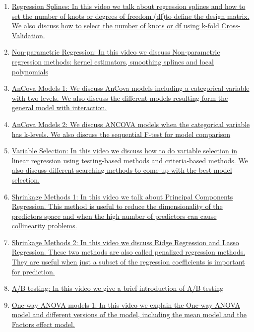 \documentclass[11pt]{article}
\begin{document}
\begin{enumerate}
	\item \href{https://mp.weixin.qq.com/s/4uLYtZnD3TQ-Oi7aF2BGug}{Regression Splines: In this video we talk about regression splines and how to set the number of knots or degrees of freedom  (df)to define the design matrix. We also discuss how to select the number of knots or df using k-fold Cross-Validation.}	%
	\item \href{https://mp.weixin.qq.com/s/MTY8Eyavgnd8c2npyh1Tkw}{Non-parametric Regression: In this video we discuss Non-parametric regression methods: kernel estimators, smoothing splines and local polynomials}	%
	\item \href{https://mp.weixin.qq.com/s/aq4OgekCqkyrpdShuakUFw}{AnCova Models 1: We discuss AnCova models including a categorical variable with two-levels. We also discuss the different models resulting form the general model with interaction.}	%
	\item \href{https://mp.weixin.qq.com/s/fydJsiF4AvlQAo9F_eY59Q}{AnCova Models 2: We discuss ANCOVA models when the categorical variable has k-levels. We also discuss the sequential F-test for model comparison}	%
	\item \href{https://mp.weixin.qq.com/s/8mDK4IzTxbvssrVxRTfkVQ}{Variable Selection: In this video we discuss how to do variable selection in linear regression using testing-based methods and criteria-based methods. We also discuss different searching methods to come up with the best model selection.}	%
	\item \href{https://mp.weixin.qq.com/s/BrPASb00jklNy0506RBLtw}{Shrinkage Methods 1: In this video we talk about Principal Components Regression. This method is useful to reduce the dimensionality of the predictors space and  when the high number of predictors  can cause collinearity problems.}	%
	\item \href{https://mp.weixin.qq.com/s/gie_Ndz74VJPEgB60rs8Pw}{Shrinkage Methods 2: In this video we discuss Ridge Regression and Lasso Regression. These two methods are also called penalized regression methods. They are useful when just a subset of the regression coefficients is important for prediction.}	%
	\item \href{https://mp.weixin.qq.com/s/M8ntjxVx4CHMo_NZmAWdjw}{ A/B testing: In this video we give a brief introduction of A/B testing}	%
	\item \href{https://mp.weixin.qq.com/s/AvWnVaxS985WxOC9fBqjAA}{One-way ANOVA models 1: In this video we explain the One-way ANOVA model and different versions of the model, including the mean model and the Factors effect model.}	%

\end{enumerate}
\end{document}
